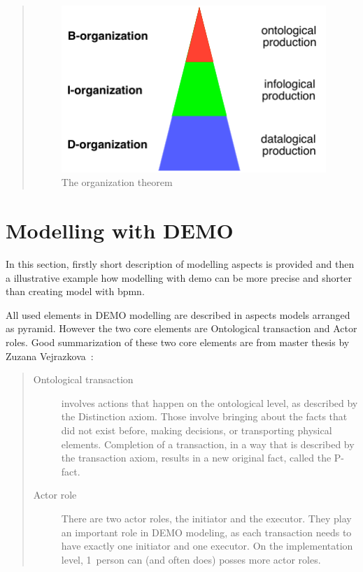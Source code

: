 \begin{quotation}
\begin{figure}[ht!]
	\centering
    \includegraphics[width=10cm, keepaspectratio]{img/OrganizationPyramid}
    \caption{The organization theorem}
    \label{fig:OrganizationPyramid}
\end{figure}

\end{quotation}

\section{Modelling with DEMO}
In this section, firstly short description of modelling aspects is provided and then a illustrative example how modelling with \gls{demo} can be more precise and shorter than creating model with \gls{bpmn}. 

All used elements in DEMO modelling are described in aspects models arranged as pyramid. However the two core elements are Ontological transaction and Actor roles. Good summarization of these two core elements are from master thesis by Zuzana Vejrazkova~\cite{vejrazkova-demo-2013}:

\begin{quote}
	\begin{description}
		\item[Ontological transaction] involves actions that happen on the ontological level, as described by the Distinction axiom. Those involve bringing about the facts that did not exist before, making decisions, or transporting physical elements. Completion of a transaction, in a way that is described by the transaction axiom, results in a new original fact, called the P-fact.
        \item[Actor role] There are two actor roles, the initiator and the executor. They play an important role in DEMO modeling, as each transaction needs to have exactly one initiator and one executor. On the implementation level, 1~person can (and often does) posses more actor roles.
	\end{description}
\end{quote}

